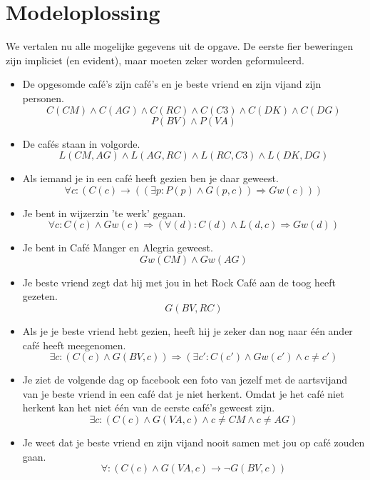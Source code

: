 \documentclass[alternative-exam.tex]{subfiles}
\begin{document}
\section{Modeloplossing}
We vertalen nu alle mogelijke gegevens uit de opgave. De eerste fier beweringen zijn impliciet (en evident), maar moeten zeker worden geformuleerd.
\begin{itemize}
\item De opgesomde caf\'e's zijn caf\'e's en je beste vriend en zijn vijand zijn personen.
\[ C(CM)\wedge C(AG)\wedge C(RC)\wedge C(C3)\wedge C(DK)\wedge C(DG) \]
\[ P(BV) \wedge P(VA)\]
\item De caf\'es staan in volgorde.
\[
L(CM,AG) \wedge L(AG,RC) \wedge L(RC,C3) \wedge L(DK,DG) 
\]
\item Als iemand je in een caf\'e heeft gezien ben je daar geweest.
\[
\forall c: (C(c) \rightarrow ((\exists p : P(p) \wedge G(p,c)) \Rightarrow Gw(c)))
\]
\item Je bent in wijzerzin 'te werk' gegaan.
\[
\forall c: C(c) \wedge Gw(c) \Rightarrow (\forall(d): C(d) \wedge L(d,c) \Rightarrow Gw(d))
\]
\item Je bent in Caf\'e Manger en Alegria geweest.
\[
Gw(CM) \wedge Gw(AG)
\]
\item Je beste vriend zegt dat hij met jou in het Rock Caf\'e aan de toog heeft gezeten.
\[
G(BV,RC)
\]
\item Als je je beste vriend hebt gezien, heeft hij je zeker dan nog naar \'e\'en ander caf\'e heeft meegenomen.
\[
\exists c: (C(c) \wedge G(BV,c)) \Rightarrow (\exists c': C(c') \wedge Gw(c') \wedge c \neq c')
\]
\item Je ziet de volgende dag op facebook een foto van jezelf met de aartsvijand van je beste vriend in een caf\'e dat je niet herkent. Omdat je het caf\'e niet herkent kan het niet \'e\'en van de eerste caf\'e's geweest zijn. 
\[
\exists c: (C(c) \wedge G(VA,c) \wedge c\neq CM \wedge c \neq AG)
\]
\item Je weet dat je beste vriend en zijn vijand nooit samen met jou op caf\'e zouden gaan.
\[
\forall : (C(c) \wedge G(VA,c) \rightarrow \neg G(BV,c))
\]

\end{itemize}
\end{document}
